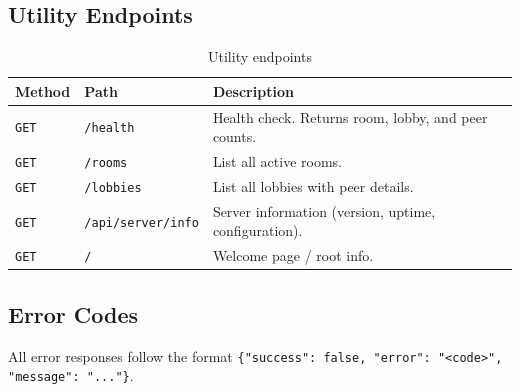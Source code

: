 \subsection{Utility Endpoints}
\label{app:c:utility-endpoints}

\begin{table}[htbp]
    \centering
    \caption{Utility endpoints}
    \begin{tabular}{@{}llp{7cm}@{}}
        \toprule
        \textbf{Method} & \textbf{Path}             & \textbf{Description}                                 \\
        \midrule
        \texttt{GET}    & \texttt{/health}          & Health check. Returns room, lobby, and peer counts.  \\
        \texttt{GET}    & \texttt{/rooms}           & List all active rooms.                               \\
        \texttt{GET}    & \texttt{/lobbies}         & List all lobbies with peer details.                  \\
        \texttt{GET}    & \texttt{/api/server/info} & Server information (version, uptime, configuration). \\
        \texttt{GET}    & \texttt{/}                & Welcome page / root info.                            \\
        \bottomrule
    \end{tabular}
\end{table}

\subsection{Error Codes}
\label{app:c:error-codes}

All error responses follow the format \texttt{\{"success": false, "error": "<code>", "message": "..."\}}.

